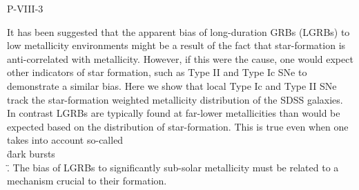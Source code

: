 P-VIII-3


\bigskip



\bigskip

\noindent It has been suggested that the apparent bias of long-duration GRBs (LGRBs) to low metallicity environments might be a result of the fact that star-formation is anti-correlated with metallicity.   However, if this were the cause, one would expect other indicators of star formation, such as Type II and Type Ic SNe to demonstrate a similar bias.  Here we show that local Type Ic and Type II SNe track the star-formation weighted metallicity distribution of the SDSS galaxies.  In contrast LGRBs are typically found at far-lower metallicities than would be expected based on the distribution of star-formation.   This is true even when one takes into account so-called \\\"dark bursts\\\".  The bias of LGRBs to significantly sub-solar metallicity must be related to a mechanism crucial to their formation.
